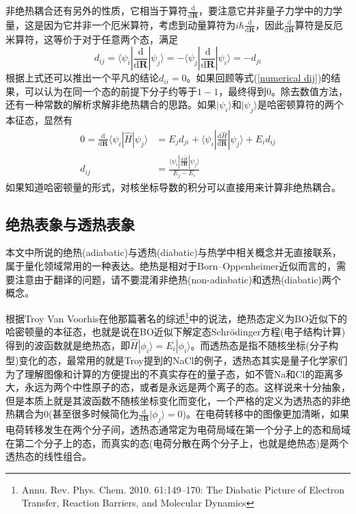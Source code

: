 \documentclass{article}
\numberwithin{equation}{section}
\begin{document}
        非绝热耦合还有另外的性质，它相当于算符$\frac{\mathrm{d}}{\mathrm{d}\mathbf{R}}$，要注意它并非量子力学中的力学量，这是因为它并非一个厄米算符，考虑到动量算符为$i\hbar\frac{\mathrm{d}}{\mathrm{d}\mathbf{R}}$，因此$\frac{\mathrm{d}}{\mathrm{d}\mathbf{R}}$算符是反厄米算符，这等价于对于任意两个态，满足
        \begin{equation}
          d_{ij}=\langle\psi_i|\frac{\mathrm{d}}{\mathrm{d}\mathbf{R}}|\psi_j\rangle=-\langle\psi_j|\frac{\mathrm{d}}{\mathrm{d}\mathbf{R}}|\psi_i\rangle=-d_{ji}
          \label{dij=-dji}
        \end{equation}
        根据上式还可以推出一个平凡的结论$d_{ii}=0$。如果回顾等式(\ref{numerical dij})的结果，可以认为在同一个态的前提下分子约等于$1-1$，最终得到$0$。除去数值方法，还有一种常数的解析求解非绝热耦合的思路。如果$|\psi_i\rangle$和$|\psi_j\rangle$是哈密顿算符的两个本征态，显然有
        \begin{equation}
          \begin{aligned}
            0=\frac{\mathrm{d}}{\mathrm{d}\mathbf{R}}\langle\psi_i|\hat{H}|\psi_j\rangle&=E_j d_{ji}+\langle\psi_i|\frac{\mathrm{d}\hat{H}}{\mathrm{d}\mathbf{R}}|\psi_j\rangle+E_i d_{ij}\\
            d_{ij}&=\frac{\langle\psi_i|\frac{\mathrm{d}\hat{H}}{\mathrm{d}\mathbf{R}}|\psi_j\rangle}{E_j-E_i}
          \end{aligned} 
          \label{analytical dij}
        \end{equation}
        如果知道哈密顿量的形式，对核坐标导数的积分可以直接用来计算非绝热耦合。
      \subsection{绝热表象与透热表象}
        本文中所说的绝热(adiabatic)与透热(diabatic)与热学中相关概念并无直接联系，属于量化领域常用的一种表达。绝热是相对于Born–Oppenheimer近似而言的，需要注意由于翻译的问题，请不要混淆非绝热(non-adiabatic)和透热(diabatic)两个概念。

        根据Troy Van Voorhis在他那篇著名的综述\footnote{Annu. Rev. Phys. Chem. 2010. 61:149–170: The Diabatic Picture of Electron Transfer, Reaction Barriers, and Molecular Dynamics}中的说法，绝热态定义为BO近似下的哈密顿量的本征态，也就是说在BO近似下解定态Schr\"odinger方程(电子结构计算)得到的波函数就是绝热态，即$\hat{H}|\phi_i\rangle=E_i|\phi_i\rangle$。而透热态是指不随核坐标(分子构型)变化的态，最常用的就是Troy提到的NaCl的例子，透热态其实是量子化学家们为了理解图像和计算的方便提出的不真实存在的量子态，如不管Na和Cl的距离多大，永远为两个中性原子的态，或者是永远是两个离子的态。这样说来十分抽象，但是本质上就是其波函数不随核坐标变化而变化，一个严格的定义为透热态的非绝热耦合为0(甚至很多时候简化为$\frac{\mathrm{d}}{\mathrm{d}\mathbf{R}}|\phi_j\rangle=0$)。在电荷转移中的图像更加清晰，如果电荷转移发生在两个分子间，透热态通常定为电荷局域在第一个分子上的态和局域在第二个分子上的态，而真实的态(电荷分散在两个分子上，也就是绝热态)是两个透热态的线性组合。
\end{document}
